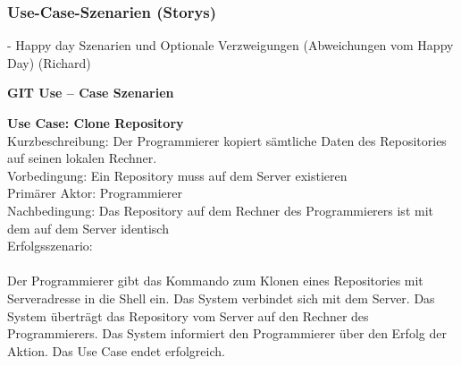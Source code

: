 \documentclass[a4paper]{article}
\begin{document}
\subsubsection{Use-Case-Szenarien (Storys)}

	- Happy day Szenarien und Optionale Verzweigungen (Abweichungen vom Happy Day) (Richard)
	
\textbf{GIT   Use – Case Szenarien}

\textbf{Use Case: 			Clone Repository}\\
Kurzbeschreibung: 	Der Programmierer kopiert sämtliche Daten des Repositories auf seinen lokalen Rechner.\\
Vorbedingung:	Ein Repository muss auf dem Server existieren\\
Primärer Aktor:	Programmierer\\
Nachbedingung:	Das Repository auf dem Rechner des Programmierers ist mit dem auf dem Server identisch\\
Erfolgsszenario:\\
\\
Der Programmierer gibt das Kommando zum Klonen eines Repositories mit Serveradresse in die Shell ein. Das System verbindet sich mit dem Server. Das System überträgt das Repository vom Server auf den Rechner des Programmierers. Das System informiert den Programmierer über den Erfolg der Aktion. Das Use Case endet erfolgreich.\\
\\
\end{document}
